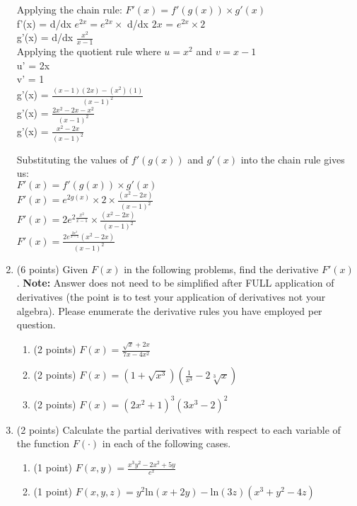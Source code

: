 \documentclass{article}%
\begin{document}
\begin{enumerate}
Applying the chain rule: $F'(x) = f'(g(x)) \times g'(x)$\\
f'(x) = d/dx $e^{2x} = e^{2x} \times$ d/dx $2x$ = $e^{2x} \times 2$\\
g'(x) = d/dx $\frac{x^2}{x-1}$ \\
Applying the quotient rule where $u = x^2$ and $v = x-1$\\
u' = 2x\\
v' = 1\\
g'(x) = $\frac{(x-1)(2x) - (x^2)(1)}{(x-1)^2}$\\
g'(x) = $\frac{2x^2 - 2x - x^2}{(x-1)^2}$\\
g'(x) = $\frac{x^2 - 2x}{(x-1)^2}$

Substituting the values of $f'(g(x))$ and $g'(x)$ into the chain rule gives us: \\
$F'(x) = f'(g(x)) \times g'(x)$\\
$F'(x) = e^{2g(x)} \times 2 \times \frac{(x^2 - 2x)}{(x-1)^2}$\\
$F'(x) = 2e^{2\frac{x^2}{x-1}} \times \frac{(x^2 - 2x)}{(x-1)^2}$\\
$F'(x) = \frac{2e^{\frac{2x^2}{x-1}}(x^2 - 2x)}{(x-1)^2}$\\

\item (6 points) Given $F(x)$ in the following problems, find the derivative $F'(x)$. \textbf{Note:} Answer does not need to be simplified after FULL application of derivatives (the point is to test your application of derivatives not your algebra). Please enumerate the derivative rules you have employed per question.
\begin{enumerate}
    \item (2 points) $F(x) =\frac{\sqrt{x}+2x}{7x-4x^2}$\\
    \item (2 points) $F(x) = (1 + \sqrt{x^3})(\frac{1}{x^3} - 2\sqrt[3]{x})$\\
    \item (2 points) $F(x) = (2x^2+1)^3(3x^3-2)^2$\\
\end{enumerate}
\item (2 points) Calculate the partial derivatives with respect to each variable of the function $F(\cdot)$ in each of the following cases.
\begin{enumerate}
    \item (1 point) $F(x,y) = \frac{x^3y^2 - 2x^2 + 5y}{e^x}$\\
    \item (1 point) $F(x,y,z) = y^2\mathrm{ln}(x+2y) -  \mathrm{ln}(3z)(x^3 + y^2 -4z)$
\end{enumerate}


\end{enumerate}
\end{document}
